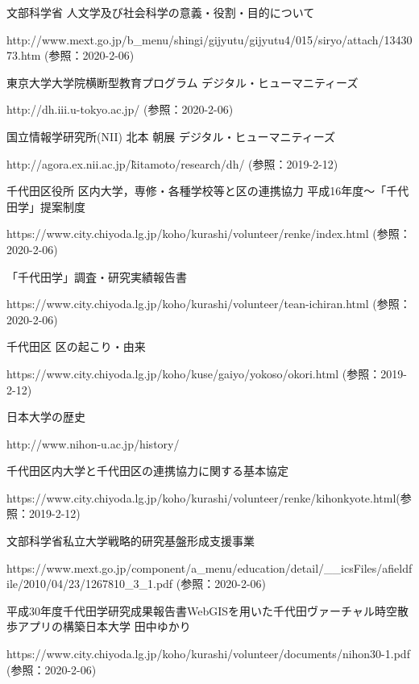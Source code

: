 \documentclass[a4paper, twoside]{jarticle}
\begin{document}
\begin{thebibliography}{99}

文部科学省 人文学及び社会科学の意義・役割・目的について\par
http://www.mext.go.jp/b\_menu/shingi/gijyutu/gijyutu4/015/siryo/attach/1343073.htm (参照：2020-2-06)

東京大学大学院横断型教育プログラム デジタル・ヒューマニティーズ\par
http://dh.iii.u-tokyo.ac.jp/ (参照：2020-2-06)

国立情報学研究所(NII) 北本 朝展 デジタル・ヒューマニティーズ\par
http://agora.ex.nii.ac.jp/\~kitamoto/research/dh/ (参照：2019-2-12)

千代田区役所 区内大学，専修・各種学校等と区の連携協力 平成16年度〜「千代田学」提案制度\par
https://www.city.chiyoda.lg.jp/koho/kurashi/volunteer/renke/index.html (参照：2020-2-06)

「千代田学」調査・研究実績報告書\par
https://www.city.chiyoda.lg.jp/koho/kurashi/volunteer/tean-ichiran.html (参照：2020-2-06)

千代田区 区の起こり・由来\par
https://www.city.chiyoda.lg.jp/koho/kuse/gaiyo/yokoso/okori.html (参照：2019-2-12)

日本大学の歴史\par
http://www.nihon-u.ac.jp/history/

千代田区内大学と千代田区の連携協力に関する基本協定\par
https://www.city.chiyoda.lg.jp/koho/kurashi/volunteer/renke/kihonkyote.html(参照：2019-2-12)

文部科学省私立大学戦略的研究基盤形成支援事業\par
https://www.mext.go.jp/component/a\_menu/education/detail/\_\_icsFiles/afieldfile/2010/04/23/1267810\_3\_1.pdf (参照：2020-2-06)


平成30年度千代田学研究成果報告書WebGISを用いた千代田ヴァーチャル時空散歩アプリの構築日本大学 田中ゆかり\par
https://www.city.chiyoda.lg.jp/koho/kurashi/volunteer/documents/nihon30-1.pdf (参照：2020-2-06)


\end{thebibliography}
\end{document}
